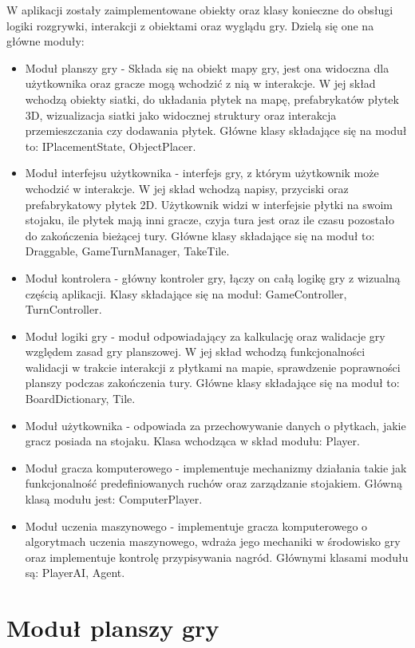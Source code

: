\documentclass[a4paper,twoside,12pt]{book}
\begin{document}
	W aplikacji zostały zaimplementowane obiekty oraz klasy konieczne do obsługi logiki rozgrywki, interakcji z obiektami oraz wyglądu gry. Dzielą się one na główne moduły:
	\begin{itemize}
		\item Moduł planszy gry - Składa się na obiekt mapy gry, jest ona widoczna dla użytkownika oraz gracze mogą wchodzić z nią w interakcje. W jej skład wchodzą obiekty siatki, do układania płytek na mapę, prefabrykatów płytek 3D, wizualizacja siatki jako widocznej struktury oraz interakcja przemieszczania czy dodawania płytek. Główne klasy składające się na moduł to: IPlacementState, ObjectPlacer.
		\item Moduł interfejsu użytkownika - interfejs gry, z którym użytkownik może wchodzić w interakcje. W jej skład wchodzą napisy, przyciski oraz prefabrykatowy płytek 2D. Użytkownik widzi w interfejsie płytki na swoim stojaku, ile płytek mają inni gracze, czyja tura jest oraz ile czasu pozostało do zakończenia bieżącej tury. Główne klasy składające się na moduł to: Draggable, GameTurnManager, TakeTile.
		\item Moduł kontrolera - główny kontroler gry, łączy on całą logikę gry z wizualną częścią aplikacji. Klasy składające się na moduł: GameController, TurnController.
		\item Moduł logiki gry - moduł odpowiadający za kalkulację oraz walidacje gry względem zasad gry planszowej. W jej skład wchodzą funkcjonalności walidacji w trakcie interakcji z płytkami na mapie, sprawdzenie poprawności planszy podczas zakończenia tury. Główne klasy składające się na moduł to: BoardDictionary, Tile.
		\item Moduł użytkownika - odpowiada za przechowywanie danych o płytkach, jakie gracz posiada na stojaku. Klasa wchodząca w skład modułu: Player.
		\item Moduł gracza komputerowego - implementuje mechanizmy działania takie jak funkcjonalność predefiniowanych ruchów oraz zarządzanie stojakiem. Główną klasą modułu jest: ComputerPlayer.
		\item Moduł uczenia maszynowego - implementuje gracza komputerowego o algorytmach uczenia maszynowego, wdraża jego mechaniki w środowisko gry oraz implementuje kontrolę przypisywania nagród. Głównymi klasami modułu są: PlayerAI, Agent.
	\end{itemize}

	
	
	\section{Moduł planszy gry}
\end{document}
